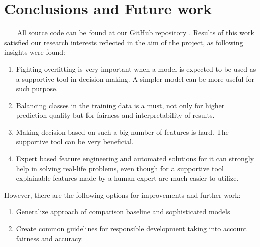 \section{Conclusions and Future work}~~~
    All source code can be found at our GitHub repository \cite{our_github}. Results of this work satisfied our research interests reflected in the aim of the project, as following insights were found:
    \begin{enumerate}
        \item Fighting overfitting is very important when a model is expected to be used as a supportive tool in decision making. A simpler model can be more useful for such purpose.
        \item Balancing classes in the training data is a must, not only for higher prediction quality but for fairness and interpretability of results.
        \item Making decision based on such a big number of features is hard. The supportive tool can be very beneficial. 
        \item Expert based feature engineering and automated solutions for it can strongly help in solving real-life problems, even though for a supportive tool explainable features made by a human expert are much easier to utilize.
    \end{enumerate}
    
    However, there are the following options for improvements and further work:
    \begin{enumerate}
        \item Generalize approach of comparison baseline and sophisticated models
        \item Create common guidelines for responsible development taking into account fairness and accuracy.
    \end{enumerate}




